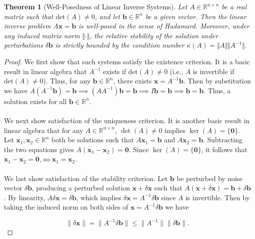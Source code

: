 \documentclass{article}
\newtheorem{theorem}{Theorem}
\theoremstyle{definition}
\begin{document}
\begin{theorem}[Well-Posedness of Linear Inverse Systems]
Let $A \in \mathbb{R}^{n \times n}$ be a real matrix such that $\text{det}(A) \neq 0$, and let $\mathbf{b} \in \mathbb{R}^n$ be a given vector. Then the linear inverse problem $A\mathbf{x} = \mathbf{b}$ is well-posed in the sense of Hadamard. Moreover, under any induced matrix norm $\Vert{}\cdot\Vert{}$, the relative stability of the solution under perturbations $\delta \mathbf{b}$ is strictly bounded by the condition number $\kappa(A) = \Vert{}A\Vert{} \Vert{}A^{-1}\Vert{}$.
\end{theorem}

\begin{proof}
We first show that such systems satisfy the existence criterion. It is a basic result in linear algebra that $A^{-1}$ exists if $\text{det}(A) \neq 0$ (i.e., $A$ is invertible if $\text{det}(A) \neq 0$). Thus, for any $\mathbf{b} \in \mathbb{R}^n$, there exists $\mathbf{x} = A^{-1}\mathbf{b}$. Then by substitution we have $A(A^{-1} \mathbf{b}) = \mathbf{b} \implies (A A^{-1})\mathbf{b} = \mathbf{b} \implies I\mathbf{b} = \mathbf{b} \implies \mathbf{b} = \mathbf{b}$. Thus, a solution exists for all $\mathbf{b} \in \mathbb{R}^n$. \\
\\
We next show satisfaction of the uniqueness criterion. It is another basic result in linear algebra that for any $A \in \mathbb{R}^{n \times n}$, $\det(A) \neq 0$ implies $\ker(A) = \{\mathbf{0}\}$. Let $\mathbf{x}_1, \mathbf{x}_2 \in \mathbb{R}^n$ both be solutions such that $A\mathbf{x}_1 = \mathbf{b}$ and $A\mathbf{x}_2 = \mathbf{b}$. Subtracting the two equations gives $A(\mathbf{x}_1 - \mathbf{x}_2) = \mathbf{0}$. Since $\ker(A) = \{\mathbf{0}\}$, it follows that $\mathbf{x}_1 - \mathbf{x}_2 = \mathbf{0}$, so $\mathbf{x}_1 = \mathbf{x}_2$. \\
\\
We last show satisfaction of the stability criterion. Let $\mathbf{b}$ be perturbed by noise vector $\delta \mathbf{b}$, producing a perturbed solution $\mathbf{x} + \delta \mathbf{x}$ such that $A(\mathbf{x} + \delta \mathbf{x}) = \mathbf{b} + \delta \mathbf{b}$. By linearity, $A \delta \mathbf{x} = \delta \mathbf{b}$, which implies $\delta \mathbf{x} = A^{-1} \delta \mathbf{b}$ since $A$ is invertible. Then by taking the induced norm on both sides of $\mathbf{x} = A^{-1} \delta \mathbf{b}$ we have

\[
\|\delta \mathbf{x}\| = \|A^{-1} \delta \mathbf{b}\| \leq \|A^{-1}\| \|\delta \mathbf{b}\|.
\]


\end{proof}
\end{document}
